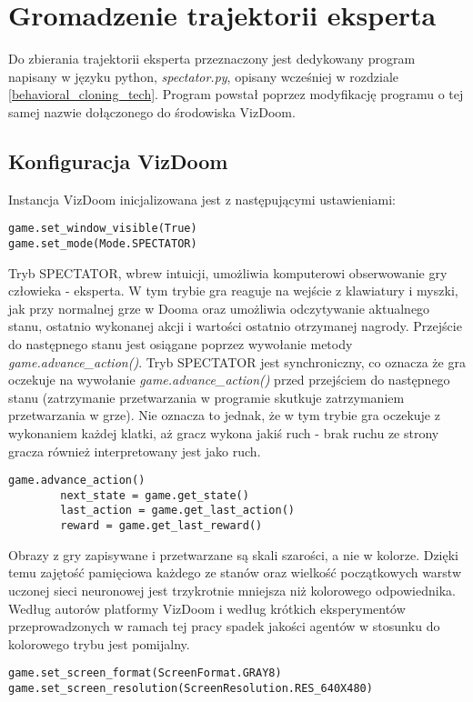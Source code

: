 \section{Gromadzenie trajektorii eksperta}

Do zbierania trajektorii eksperta przeznaczony jest dedykowany program napisany w języku python, \textit{spectator.py}, opisany wcześniej w rozdziale \ref{behavioral_cloning_tech}. Program powstał poprzez modyfikację programu o tej samej nazwie dołączonego do środowiska VizDoom.

\subsection{Konfiguracja VizDoom}
Instancja VizDoom inicjalizowana jest z następującymi ustawieniami:

\begin{lstlisting}[language=iPython]
game.set_window_visible(True)
game.set_mode(Mode.SPECTATOR)
\end{lstlisting}

Tryb SPECTATOR, wbrew intuicji, umożliwia komputerowi obserwowanie gry człowieka - eksperta. W tym trybie gra reaguje na wejście z klawiatury i myszki, jak przy normalnej grze w Dooma oraz umożliwia odczytywanie aktualnego stanu, ostatnio wykonanej akcji i wartości ostatnio otrzymanej nagrody. Przejście do następnego stanu jest osiągane poprzez wywołanie metody \textit{game.advance\_action()}. Tryb SPECTATOR jest synchroniczny, co oznacza że gra oczekuje na wywołanie \textit{game.advance\_action()} przed przejściem do następnego stanu (zatrzymanie przetwarzania w programie skutkuje zatrzymaniem przetwarzania w grze). Nie oznacza to jednak, że w tym trybie gra oczekuje z wykonaniem każdej klatki, aż gracz wykona jakiś ruch - brak ruchu ze strony gracza również interpretowany jest jako ruch.

\begin{lstlisting}[language=iPython]
 	game.advance_action()
        next_state = game.get_state()
        last_action = game.get_last_action()
        reward = game.get_last_reward()
\end{lstlisting}

Obrazy z gry zapisywane i przetwarzane są skali szarości, a nie w kolorze. Dzięki temu zajętość pamięciowa każdego ze stanów oraz wielkość początkowych warstw uczonej sieci neuronowej jest trzykrotnie mniejsza niż kolorowego odpowiednika. Według autorów platformy VizDoom i według krótkich eksperymentów przeprowadzonych w ramach tej pracy spadek jakości agentów w stosunku do kolorowego trybu jest pomijalny.
\begin{lstlisting}[language=iPython]
game.set_screen_format(ScreenFormat.GRAY8)
game.set_screen_resolution(ScreenResolution.RES_640X480)
\end{lstlisting}

